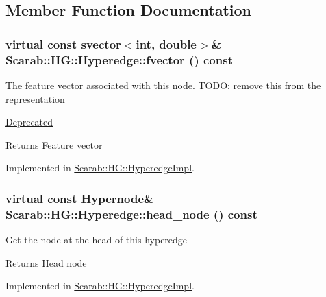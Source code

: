 \subsection{Member Function Documentation}
\hypertarget{classScarab_1_1HG_1_1Hyperedge_a0d201ddb955631aadee4c15cc8e709f8}{
\subsubsection[{fvector}]{\setlength{\rightskip}{0pt plus 5cm}virtual const svector$<$int, double$>$\& Scarab::HG::Hyperedge::fvector () const}}
\label{classScarab_1_1HG_1_1Hyperedge_a0d201ddb955631aadee4c15cc8e709f8}
The feature vector associated with this node. TODO: remove this from the representation \begin{Desc}
\item[\hyperlink{deprecated__deprecated000005}{Deprecated}]\end{Desc}
\begin{DoxyReturn}{Returns}
Feature vector 
\end{DoxyReturn}


Implemented in \hyperlink{classScarab_1_1HG_1_1HyperedgeImpl_a359446c285164a93995bb87e6ea74882}{Scarab::HG::HyperedgeImpl}.

\hypertarget{classScarab_1_1HG_1_1Hyperedge_a6043de341070c103d811f5286193dd46}{
\subsubsection[{head\_\-node}]{\setlength{\rightskip}{0pt plus 5cm}virtual const {\bf Hypernode}\& Scarab::HG::Hyperedge::head\_\-node () const}}
\label{classScarab_1_1HG_1_1Hyperedge_a6043de341070c103d811f5286193dd46}
Get the node at the head of this hyperedge

\begin{DoxyReturn}{Returns}
Head node 
\end{DoxyReturn}


Implemented in \hyperlink{classScarab_1_1HG_1_1HyperedgeImpl_ae194bfc8ecac2a12791fa36c1c2c62a7}{Scarab::HG::HyperedgeImpl}.

